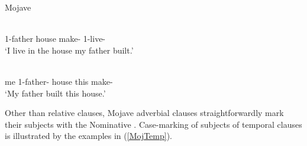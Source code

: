 \enlargethispage{\baselineskip}
\begin{exe}\ex\label{MojRelSub} {Mojave} \citetext{\citealt[451]{Munro:1977}, \citealt[221]{Munro:1976}}\nopagebreak[4]
\begin{xlist}
\ex\gll  {\rm[}  \textipa{u:\v co:}{\rm]} \\
1-father house make-\loc{} 1-live-\tns{}\\
\glt `I live in the house my father built.'

\ex\gll {}    \\
me 1-father-\nom{} house this make-\tns{}\\
\glt `My father built this house.'
\end{xlist}
\end{exe} 




Other than relative clauses, Mojave adverbial clauses straightforwardly mark their subjects with the Nominative .
Case-marking of subjects of temporal clauses is illustrated by the examples in (\ref{MojTemp}).  

